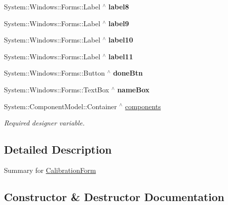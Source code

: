 \begin{DoxyCompactItemize}
System\+::\+Windows\+::\+Forms\+::\+Label $^\wedge$ {\bfseries label8}
\item 
\mbox{\label{class_gaze_track_g_u_i_1_1_calibration_form_a67bb80d457e1a8eb0d34061221f489dc}} 
System\+::\+Windows\+::\+Forms\+::\+Label $^\wedge$ {\bfseries label9}
\item 
\mbox{\label{class_gaze_track_g_u_i_1_1_calibration_form_a537c831514ab4aa8b1c8ca28e4b2781f}} 
System\+::\+Windows\+::\+Forms\+::\+Label $^\wedge$ {\bfseries label10}
\item 
\mbox{\label{class_gaze_track_g_u_i_1_1_calibration_form_a3e0a6ab03cc68c4f5a9c34ae29df4c97}} 
System\+::\+Windows\+::\+Forms\+::\+Label $^\wedge$ {\bfseries label11}
\item 
\mbox{\label{class_gaze_track_g_u_i_1_1_calibration_form_a55f84b550b25b650893ac7480f51eb90}} 
System\+::\+Windows\+::\+Forms\+::\+Button $^\wedge$ {\bfseries done\+Btn}
\item 
\mbox{\label{class_gaze_track_g_u_i_1_1_calibration_form_a4af4ca8ba916ac8d207365031768a819}} 
System\+::\+Windows\+::\+Forms\+::\+Text\+Box $^\wedge$ {\bfseries name\+Box}
\item 
System\+::\+Component\+Model\+::\+Container $^\wedge$ \mbox{\hyperlink{class_gaze_track_g_u_i_1_1_calibration_form_a27cbe7b426a34ce1e7509ecf62a3d3a3}{components}}
\begin{DoxyCompactList}\small\item\em Required designer variable. \end{DoxyCompactList}\end{DoxyCompactItemize}


\subsection{Detailed Description}
Summary for \mbox{\hyperlink{class_gaze_track_g_u_i_1_1_calibration_form}{Calibration\+Form}} 



\subsection{Constructor \& Destructor Documentation}
\mbox{\label{class_gaze_track_g_u_i_1_1_calibration_form_a761b521b0ba7b8effae472f061f7fa2f}} 
